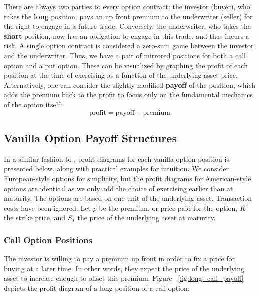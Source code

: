 \documentclass[english,12pt,a4paper,pdftex,sci,utf8]{aaltothesis}
\begin{document}
There are always two parties to every option contract: the investor (buyer), who takes the \textbf{long} position, pays an up front premium to the underwriter (seller) for the right to engage in a future trade. Conversely, the underwriter, who takes the \textbf{short} position, now has an obligation to engage in this trade, and thus incurs a risk. A single option contract is considered a zero-sum game between the investor and the underwriter. Thus, we have a pair of mirrored positions for both a call option and a put option. These can be visualized by graphing the profit of each position at the time of exercising as a function of the underlying asset price. Alternatively, one can consider the slightly modified \textbf{payoff} of the position, which adds the premium back to the profit to focus only on the fundamental mechanics of the option itself:
\begin{equation}
    \text{profit}=\text{payoff}-\text{premium}
\end{equation}

\subsection{Vanilla Option Payoff Structures}\label{payoffs}


In a similar fashion to \cite[pp. 7-10]{hull2016options}, profit diagrams for each vanilla option position is presented below, along with practical examples for intuition. We consider European-style options for simplicity, but the profit diagrams for American-style options are identical as we only add the choice of exercising earlier than at maturity. The options are based on one unit of the underlying asset. Transaction costs have been ignored. Let $p$ be the premium, or price paid for the option, $K$ the strike price, and $S_T$ the price of the underlying asset at maturity.



\subsubsection{Call Option Positions}
The investor is willing to pay a premium up front in order to fix a price for buying at a later time. In other words, they expect the price of the underlying asset to increase enough to offset this premium. Figure ~\ref{fig:long_call_payoff} depicts the profit diagram of a long position of a call option:
\end{document}
